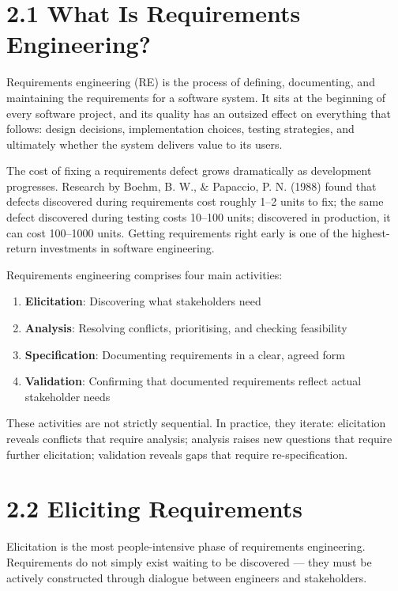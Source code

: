 \documentclass[11pt,a4paper]{book}
\begin{document}
\medskip

\section{2.1 What Is Requirements Engineering?}

Requirements engineering (RE) is the process of defining, documenting, and maintaining the requirements for a software system. It sits at the beginning of every software project, and its quality has an outsized effect on everything that follows: design decisions, implementation choices, testing strategies, and ultimately whether the system delivers value to its users.

The cost of fixing a requirements defect grows dramatically as development progresses. Research by Boehm, B. W., \& Papaccio, P. N. (1988) found that defects discovered during requirements cost roughly 1--2 units to fix; the same defect discovered during testing costs 10--100 units; discovered in production, it can cost 100--1000 units. Getting requirements right early is one of the highest-return investments in software engineering.

Requirements engineering comprises four main activities:

\begin{enumerate}
  \item \textbf{Elicitation}: Discovering what stakeholders need
  \item \textbf{Analysis}: Resolving conflicts, prioritising, and checking feasibility
  \item \textbf{Specification}: Documenting requirements in a clear, agreed form
  \item \textbf{Validation}: Confirming that documented requirements reflect actual stakeholder needs
\end{enumerate}

These activities are not strictly sequential. In practice, they iterate: elicitation reveals conflicts that require analysis; analysis raises new questions that require further elicitation; validation reveals gaps that require re-specification.

\medskip

\section{2.2 Eliciting Requirements}

Elicitation is the most people-intensive phase of requirements engineering. Requirements do not simply exist waiting to be discovered --- they must be actively constructed through dialogue between engineers and stakeholders.
\end{document}
